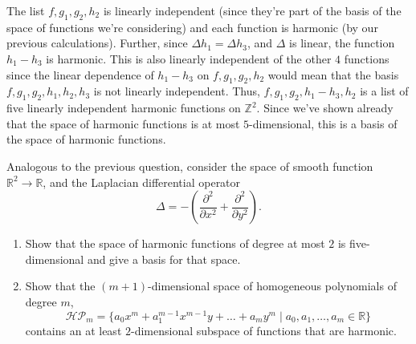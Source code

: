 \documentclass[12 pt, letterpaper]{hmcpset}
\begin{document}
\begin{solution}
\begin{enumerate}
			The list $f, g_{1}, g_{2}, h_{2}$ is linearly independent (since they're part of the basis of the space of functions we're considering) and each function is harmonic (by our previous calculations). Further, since $\Delta h_{1} = \Delta h_{3}$, and $\Delta$ is linear, the function $h_{1} - h_{3}$ is harmonic. This is also linearly independent of the other $4$ functions since the linear dependence of $h_{1} - h_{3}$ on $f, g_{1}, g_{2}, h_{2}$ would mean that the basis $f, g_{1}, g_{2}, h_{1}, h_{2}, h_{3}$ is not linearly independent. Thus, $f, g_{1}, g_{2}, h_{1} - h_{3}, h_{2}$ is a list of five linearly independent harmonic functions on $\mathbb{Z}^{2}$. Since we've shown already that the space of harmonic functions is at most $5$-dimensional, this is a basis of the space of harmonic functions.
	\end{enumerate}
\end{solution}

\pagebreak

\begin{problem}[38.]
	Analogous to the previous question, consider the space of smooth function $\mathbb{R}^{2} \to \mathbb{R}$, and the Laplacian differential operator
	\[
		\Delta = - \left ( \frac{\partial^{2}}{\partial x^{2}} + \frac{\partial^{2}}{\partial y^{2}} \right ).
	\]
	\begin{enumerate}
		\item Show that the space of harmonic functions of degree at most $2$ is five-dimensional and give a basis for that space.

		\item Show that the $(m + 1)$-dimensional space of homogeneous polynomials of degree $m$,
			\[
				\mathcal{HP}_{m} = \{ a_{0} x^{m} + a_{1}^{m - 1} x^{m - 1} y + \dots + a_{m} y^{m} \mid a_{0}, a_{1}, \dots, a_{m} \in \mathbb{R} \}
			\]
			contains an at least $2$-dimensional subspace of functions that are harmonic.
	\end{enumerate}
\end{problem}
\end{document}
